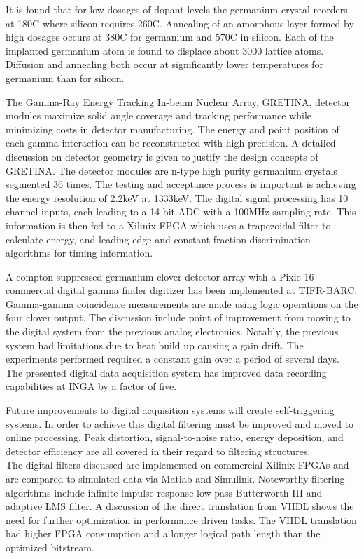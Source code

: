 \documentclass[12pt]{article}
\begin{document}
\begin{doublespacing}
It is found that for low dosages of dopant levels the germanium crystal reorders at 180C where silicon requires 260C.
Annealing of an amorphous layer formed by high dosages occurs at 380C for germanium and 570C in silicon.
Each of the implanted germanium atom is found to displace about 3000 lattice atoms.
Diffusion and annealing both occur at significantly lower temperatures for germanium than for silicon.


\cite{Paschalis201344}
The Gamma-Ray Energy Tracking In-beam Nuclear Array, GRETINA, detector modules maximize solid angle coverage and tracking performance while minimizing costs in detector manufacturing.
The energy and point position of each gamma interaction can be reconstructed with high precision.
A detailed discussion on detector geometry is given to justify the design concepts of GRETINA.
The detector modules are n-type high purity germanium crystals segmented 36 times.
The testing and acceptance process is important is achieving the energy resolution of 2.2keV at 1333keV.
The digital signal processing has 10 channel inputs, each leading to a 14-bit ADC with a 100MHz sampling rate.
This information is then fed to a Xilinix FPGA which uses a trapezoidal filter to calculate energy, and leading edge and constant fraction discrimination algorithms for timing information.


\cite{Palit201290}
A compton suppressed germanium clover detector array with a Pixie-16 commercial digital gamma finder digitizer has been implemented at TIFR-BARC.
Gamma-gamma coincidence measurements are made using logic operations on the four clover output.
The discussion include point of improvement from moving to the digital system from the previous analog electronics.
Notably, the previous system had limitations due to heat build up causing a gain drift.
The experiments performed required a constant gain over a period of several days.
The presented digital data acquisition system has improved data recording capabilities at INGA by a factor of five.


\cite{Alberto200999}
Future improvements to digital acquisition systems will create self-triggering systems.
In order to achieve this digital filtering must be improved and moved to online processing.
Peak distortion, signal-to-noise ratio, energy deposition, and detector efficiency are all covered in their regard to filtering structures.
\\

The digital filters discussed are implemented on commercial Xilinix FPGAs and are compared to simulated data via Matlab and Simulink.
Noteworthy filtering algorithms include infinite impulse response low pass Butterworth III and adaptive LMS filter.
A discussion of the direct translation from VHDL shows the need for further optimization in performance driven tasks.
The VHDL translation had higher FPGA consumption and a longer logical path length than the optimized bitstream.




\end{doublespacing}
\end{document}
